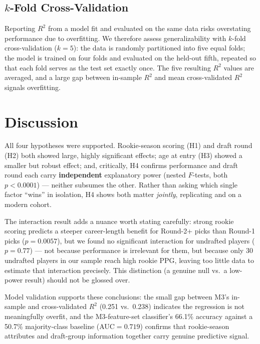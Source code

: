 \documentclass[10pt,twocolumn]{article}
\begin{document}
\subsection{$k$-Fold Cross-Validation}
Reporting $R^2$ from a model fit and evaluated on the same data risks
overstating performance due to overfitting. We therefore assess
generalizability with $k$-fold cross-validation ($k=5$): the data is
randomly partitioned into five equal folds; the model is trained on four
folds and evaluated on the held-out fifth, repeated so that each fold
serves as the test set exactly once. The five resulting $R^2$ values are
averaged, and a large gap between in-sample $R^2$ and mean
cross-validated $R^2$ signals overfitting.

\section{Discussion}
\label{sec:discussion}

All four hypotheses were supported. Rookie-season scoring (H1) and
draft round (H2) both showed large, highly significant effects; age at
entry (H3) showed a smaller but robust effect; and, critically, H4
confirms performance and draft round each carry \textbf{independent}
explanatory power (nested $F$-tests, both $p<0.0001$) --- neither
subsumes the other. Rather than asking which single factor ``wins'' in
isolation, H4 shows both matter \textit{jointly}, replicating
\citet{staw1995sunk} and \citet{groothuis2004exit} on a modern cohort.

The interaction result adds a nuance worth stating carefully: strong
rookie scoring predicts a steeper career-length benefit for Round-2+
picks than Round-1 picks ($p=0.0057$), but we found no significant
interaction for undrafted players ($p=0.77$) --- not because
performance is irrelevant for them, but because only 30 undrafted
players in our sample reach high rookie PPG, leaving too little data
to estimate that interaction precisely. This distinction (a genuine
null vs.\ a low-power result) should not be glossed over.

Model validation supports these conclusions: the small gap between
M3's in-sample and cross-validated $R^2$ (0.251 vs.\ 0.238) indicates
the regression is not meaningfully overfit, and the M3-feature-set
classifier's 66.1\% accuracy against a 50.7\% majority-class baseline
(AUC$=0.719$) confirms that rookie-season attributes and draft-group
information together carry genuine predictive signal.
\end{document}
